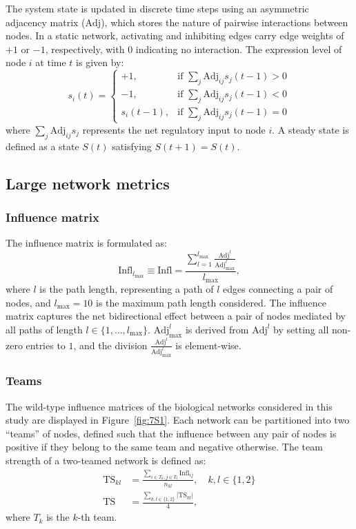 \documentclass[11pt]{article}
\newcommand{\ts}{\mathrm{TS}}
\newcommand{\inm}{\mathrm{Infl}}
\newcommand{\adj}{\mathrm{Adj}}
\begin{document}
The system state is updated in discrete time steps using an asymmetric adjacency matrix ($\adj$), which stores the nature of pairwise interactions between nodes. In a static network, activating and inhibiting edges carry edge weights of $+1$ or $-1$, respectively, with $0$ indicating no interaction. The expression level of node $i$ at time $t$ is given by:
\begin{equation} \label{eq:bool}
    s_i(t) = 
\begin{cases}
    +1, & \text{if } \sum_j \adj_{ij} s_j(t-1) > 0 \\
    -1, & \text{if } \sum_j \adj_{ij} s_j(t-1) < 0 \\
    s_i(t-1), & \text{if } \sum_j \adj_{ij} s_j(t-1) = 0
\end{cases}
\end{equation}
where $\sum_j \adj_{ij} s_j$ represents the net regulatory input to node $i$. A steady state is defined as a state $S(t)$ satisfying $S(t+1) = S(t)$.

\subsection{Large network metrics}

\subsubsection{Influence matrix}
The influence matrix is formulated as:
\begin{equation}
    \inm_{l_\mathrm{max}} \equiv \inm = \frac{\sum_{l=1}^{l_\mathrm{max}} \frac{\adj^l}{\adj_{\mathrm{max}}^l}}{l_\mathrm{max}},
\end{equation}
where $l$ is the path length, representing a path of $l$ edges connecting a pair of nodes, and $l_\mathrm{max} = 10$ is the maximum path length considered. The influence matrix captures the net bidirectional effect between a pair of nodes mediated by all paths of length $l \in \{1, \ldots, l_\mathrm{max}\}$. $\adj_{\mathrm{max}}^l$ is derived from $\adj^l$ by setting all non-zero entries to $1$, and the division $\frac{\adj^l}{\adj_{\mathrm{max}}^l}$ is element-wise.

\subsubsection{Teams}
The wild-type influence matrices of the biological networks considered in this study are displayed in Figure~\ref{fig:7S1}. Each network can be partitioned into two ``teams'' of nodes, defined such that the influence between any pair of nodes is positive if they belong to the same team and negative otherwise. The team strength of a two-teamed network is defined as:
\begin{align} \label{eq:ts_def}
    \ts_{kl} &= \frac{\sum_{i \in T_k, j \in T_l} \inm_{ij}}{n_{kl}}, \quad k, l \in \{1, 2\} \\
    \ts &= \frac{\sum_{k,l \in \{1,2\}} |\ts_{kl}|}{4},
\end{align}
where $T_k$ is the $k$-th team.
\end{document}
